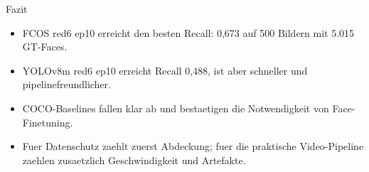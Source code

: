 \begin{frame}{Fazit}
\begin{itemize}
    \item FCOS red6 ep10 erreicht den besten Recall: 0,673 auf 500 Bildern mit 5.015 GT-Faces.
    \item YOLOv8m red6 ep10 erreicht Recall 0,488, ist aber schneller und pipelinefreundlicher.
    \item COCO-Baselines fallen klar ab und bestaetigen die Notwendigkeit von Face-Finetuning.
    \item Fuer Datenschutz zaehlt zuerst Abdeckung; fuer die praktische Video-Pipeline zaehlen zusaetzlich Geschwindigkeit und Artefakte.
\end{itemize}
\end{frame}
